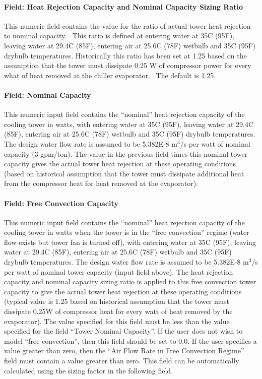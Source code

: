 \paragraph{Field: Heat Rejection Capacity and Nominal Capacity Sizing Ratio}\label{field-heat-rejection-capacity-and-nominal-capacity-sizing-ratio}

This numeric field contains the value for the ratio of actual tower heat rejection to nominal capacity.~ This ratio is defined at entering water at 35C (95F), leaving water at 29.4C (85F), entering air at 25.6C (78F) wetbulb and 35C (95F) drybulb temperatures. Historically this ratio has been set at 1.25 based on the assumption that the tower must dissipate 0.25 W of compressor power for every what of heat removed at the chiller evaporator.~ The default is 1.25.

\paragraph{Field: Nominal Capacity}\label{field-nominal-capacity}

This numeric input field contains the ``nominal'' heat rejection capacity of the cooling tower in watts, with entering water at 35C (95F), leaving water at 29.4C (85F), entering air at 25.6C (78F) wetbulb and 35C (95F) drybulb temperatures. The design water flow rate is assumed to be 5.382E-8 m\(^{3}\)/s per watt of nominal capacity (3 gpm/ton). The value in the previous field times this nominal tower capacity gives the actual tower heat rejection at these operating conditions (based on historical assumption that the tower must dissipate additional heat from the compressor heat for heat removed at the evaporator).

\paragraph{Field: Free Convection Capacity}\label{field-free-convection-capacity}

This numeric input field contains the ``nominal'' heat rejection capacity of the cooling tower in watts when the tower is in the ``free convection'' regime (water flow exists but tower fan is turned off), with entering water at 35C (95F), leaving water at 29.4C (85F), entering air at 25.6C (78F) wetbulb and 35C (95F) drybulb temperatures. The design water flow rate is assumed to be 5.382E-8 m\(^{3}\)/s per watt of nominal tower capacity (input field above). The heat rejection capacity and nominal capacity sizing ratio is applied to this free convection tower capacity to give the actual tower heat rejection at these operating conditions (typical value is 1.25 based on historical assumption that the tower must dissipate 0.25W of compressor heat for every watt of heat removed by the evaporator). The value specified for this field must be less than the value specified for the field ``Tower Nominal Capacity''. If the user does not wish to model ``free convection'', then this field should be set to 0.0. If the user specifies a value greater than zero, then the ``Air Flow Rate in Free Convection Regime'' field must contain a value greater than zero. This field can be automatically calculated using the sizing factor in the following field.

